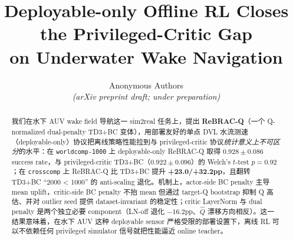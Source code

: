 \documentclass[11pt]{article}
\title{Deployable-only Offline RL Closes the Privileged-Critic Gap\\
on Underwater Wake Navigation}
\author{Anonymous Authors\\
\textit{(arXiv preprint draft; under preparation)}}
\date{}
\begin{document}
\maketitle

\begin{abstract}
我们在水下 AUV wake field 导航这一 sim2real 任务上，提出 \textbf{ReBRAC-Q}（一个 Q-normalized dual-penalty TD3+BC 变体），用部署友好的单点 DVL 水流测速（deployable-only）协议把离线策略性能拉到与 privileged-critic 协议\emph{统计意义上不可区分}的水平：在 \texttt{worldcomp-1000} 上 deployable-only ReBRAC-Q 取得 $0.928 \pm 0.086$ success rate，与 privileged-critic TD3+BC（$0.922 \pm 0.096$）的 Welch's $t$-test $p = 0.92$；在 \texttt{crosscomp} 上 ReBRAC-Q 比 TD3+BC 提升 \textbf{+23.0/+32.2pp}，且翻转 TD3+BC ``2000 < 1000'' 的 anti-scaling 退化。机制上，actor-side BC penalty 主导 mean uplift，critic-side BC penalty 不抬 mean 但通过 target-Q bootstrap 抑制 Q 高估、并对 outlier seed 提供 dataset-invariant 的稳定性；critic LayerNorm 与 dual penalty 是两个独立必要 component（LN-off 退化 $-16.2$pp、$\hat{Q}$ 漂移方向相反）。这一结果意味着，在水下 AUV 这种 deployable sensor 严格受限的部署设置下，离线 RL 可以不依赖任何 privileged simulator 信号就把性能逼近 online teacher。
\end{abstract}





\end{document}
